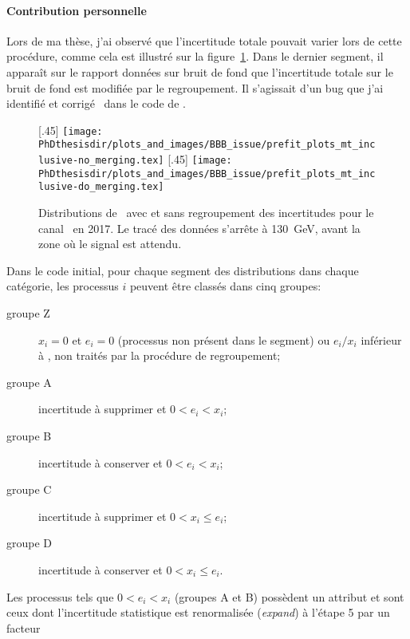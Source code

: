 \paragraph{Contribution personnelle}
Lors de ma thèse, j'ai observé que l'incertitude totale pouvait varier lors de cette procédure, comme cela est illustré sur la figure~\ref{fig-BBB_issue_2017_mt}.
Dans le dernier segment, il apparaît sur le rapport données sur bruit de fond que l'incertitude totale sur le bruit de fond est modifiée par le regroupement.
Il s'agissait d'un bug que j'ai identifié et corrigé~\cite{BBB_PR} dans le code de \COMBINE.
\begin{figure}[h]
\centering

[.45\textwidth]
{\LARGE\texttt{[image: \\PhDthesisdir/plots\_and\_images/BBB\_issue/prefit\_plots\_mt\_inclusive-no\_merging.tex]}}
\hfill
{}[.45\textwidth]
{\LARGE\texttt{[image: \\PhDthesisdir/plots\_and\_images/BBB\_issue/prefit\_plots\_mt\_inclusive-do\_merging.tex]}}

\caption[Distributions de \mTtot\ avec et sans regroupement des incertitudes.]{Distributions de \mTtot\ avec et sans regroupement des incertitudes pour le canal \mu\tauh\ en 2017. Le tracé des données s'arrête à \SI{130}{\GeV}, avant la zone où le signal est attendu.}
\label{fig-BBB_issue_2017_mt}
\end{figure}
\newpage
\par
Dans le code initial,
pour chaque segment des distributions dans chaque catégorie,
les processus $i$ peuvent être classés dans cinq groupes:
\begin{description}
\item[groupe Z] $x_i = 0$ et $e_i = 0$ (processus non présent dans le segment) ou $e_i/x_i$ inférieur à , non traités par la procédure de regroupement;
\item[groupe A] incertitude à supprimer et $0 < e_i < x_i$;
\item[groupe B] incertitude à conserver et $0 < e_i < x_i$;
\item[groupe C] incertitude à supprimer et $0 < x_i \leq e_i$;
\item[groupe D] incertitude à conserver et $0 < x_i \leq e_i$.
\end{description}
Les processus tels que $0 < e_i < x_i$ (groupes A et B)
possèdent un attribut 
et sont ceux dont l'incertitude statistique est renormalisée (\emph{expand}) à l'étape 5 par un facteur
